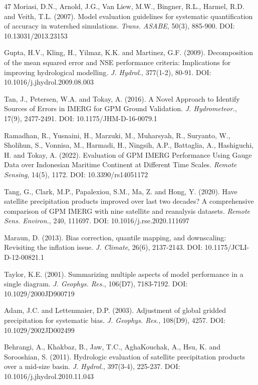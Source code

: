 \documentclass[11pt,a4paper]{article}
\begin{document}
\begin{thebibliography}{47}
 Moriasi, D.N., Arnold, J.G., Van Liew, M.W., Bingner, R.L.,
Harmel, R.D. and Veith, T.L. (2007). Model evaluation guidelines for
systematic quantification of accuracy in watershed simulations.
\emph{Trans. ASABE}, 50(3), 885-900. DOI: 10.13031/2013.23153

 Gupta, H.V., Kling, H., Yilmaz, K.K. and Martinez, G.F. (2009).
Decomposition of the mean squared error and NSE performance criteria:
Implications for improving hydrological modelling. \emph{J. Hydrol.},
377(1-2), 80-91. DOI: 10.1016/j.jhydrol.2009.08.003

 Tan, J., Petersen, W.A. and Tokay, A. (2016). A Novel Approach
to Identify Sources of Errors in IMERG for GPM Ground Validation.
\emph{J. Hydrometeor.}, 17(9), 2477-2491. DOI: 10.1175/JHM-D-16-0079.1

 Ramadhan, R., Yusnaini, H., Marzuki, M., Muharsyah, R., Suryanto, W., Sholihun, S., Vonnisa, M., Harmadi, H., Ningsih, A.P., Battaglia, A., Hashiguchi, H. and Tokay, A. (2022). Evaluation of GPM IMERG Performance Using Gauge Data over Indonesian Maritime Continent at Different Time Scales.
\emph{Remote Sensing}, 14(5), 1172. DOI: 10.3390/rs14051172

 Tang, G., Clark, M.P., Papalexiou, S.M., Ma, Z. and Hong, Y.
(2020). Have satellite precipitation products improved over last two
decades? A comprehensive comparison of GPM IMERG with nine satellite and
reanalysis datasets. \emph{Remote Sens. Environ.}, 240, 111697. DOI:
10.1016/j.rse.2020.111697

 Maraun, D. (2013). Bias correction, quantile mapping, and
downscaling: Revisiting the inflation issue. \emph{J. Climate}, 26(6),
2137-2143. DOI: 10.1175/JCLI-D-12-00821.1

 Taylor, K.E. (2001). Summarizing multiple aspects of model
performance in a single diagram. \emph{J. Geophys. Res.}, 106(D7),
7183-7192. DOI: 10.1029/2000JD900719

 Adam, J.C. and Lettenmaier, D.P. (2003). Adjustment of global
gridded precipitation for systematic bias. \emph{J. Geophys. Res.},
108(D9), 4257. DOI: 10.1029/2002JD002499

 Behrangi, A., Khakbaz, B., Jaw, T.C., AghaKouchak, A., Hsu, K.
and Sorooshian, S. (2011). Hydrologic evaluation of satellite
precipitation products over a mid-size basin. \emph{J. Hydrol.},
397(3-4), 225-237. DOI: 10.1016/j.jhydrol.2010.11.043


\end{thebibliography}
\end{document}
